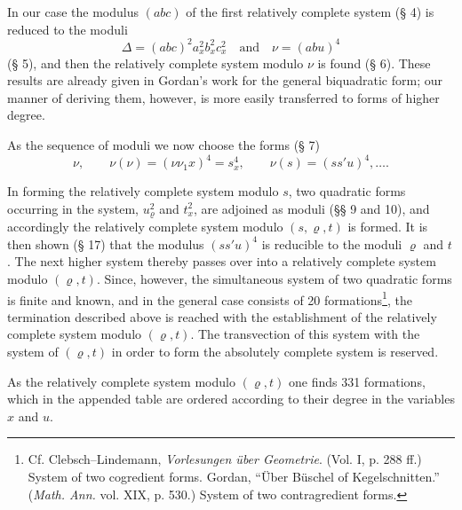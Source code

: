 \documentclass[11pt]{article}
\begin{document}
In our case the modulus $(abc)$ of the first relatively complete system (§ 4) is reduced to the moduli
\[
\Delta=(abc)^2a_x^2b_x^2c_x^2\quad\text{and}\quad \nu=(abu)^4
\]
(§ 5), and then the relatively complete system modulo $\nu$ is found (§ 6). These results are already given in Gordan's work for the general biquadratic form; our manner of deriving them, however, is more easily transferred to forms of higher degree.

As the sequence of moduli we now choose the forms (§ 7)
\[
\nu,\qquad \nu(\nu)=(\nu\nu_1x)^4=s_x^4,\qquad \nu(s)=(ss'u)^4,\ldots .
\]

In forming the relatively complete system modulo $s$, two quadratic forms occurring in the system, $u_\varrho^2$ and $t_x^2$, are adjoined as moduli (§§ 9 and 10), and accordingly the relatively complete system modulo $(s,\varrho,t)$ is formed. It is then shown (§ 17) that the modulus $(ss'u)^4$ is reducible to the moduli $\varrho$ and $t$. The next higher system thereby passes over into a relatively complete system modulo $(\varrho,t)$. Since, however, the simultaneous system of two quadratic forms is finite and known, and in the general case consists of 20 formations\footnote{Cf. Clebsch--Lindemann, \emph{Vorlesungen über Geometrie}. (Vol. I, p. 288 ff.) System of two cogredient forms. Gordan, ``Über Büschel of Kegelschnitten.'' (\emph{Math. Ann.} vol. XIX, p. 530.) System of two contragredient forms.}, the termination described above is reached with the establishment of the relatively complete system modulo $(\varrho,t)$. The transvection of this system with the system of $(\varrho,t)$ in order to form the absolutely complete system is reserved.

As the relatively complete system modulo $(\varrho,t)$ one finds 331 formations, which in the appended table are ordered according to their degree in the variables $x$ and $u$.
\end{document}
